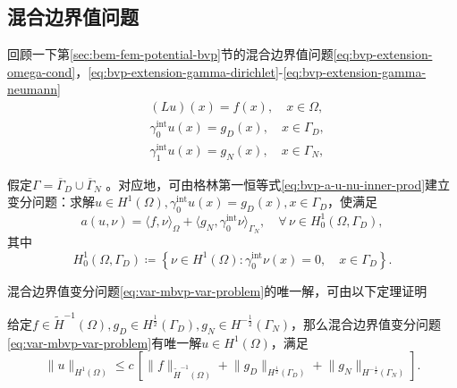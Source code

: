 \subsection{混合边界值问题}
\label{sec:var-mbvp-problem}

回顾一下第\ref{sec:bem-fem-potential-bvp}节的混合边界值问题\eqref{eq:bvp-extension-omega-cond}，\eqref{eq:bvp-extension-gamma-dirichlet}-\eqref{eq:bvp-extension-gamma-neumann}
\begin{equation}
  \label{eq:var-mbvp-problem}
  \begin{split}
    &(L u)(x) = f(x), \quad x \in \Omega, \\
    &\gamma_{0}^{\text{int}} u(x) = g_{D} (x), \quad x \in \Gamma_D,\\
    &\gamma_{1}^{\text{int}} u(x) = g_{N} (x), \quad x \in \Gamma_N,
  \end{split}
\end{equation}

假定$\Gamma = \overline{\Gamma}_{D} \cup \overline{\Gamma}_{N}$ 。对应地，可由格林第一恒等式\eqref{eq:bvp-a-u-nu-inner-prod}建立变分问题：求解$u \in H^{1}(\Omega), \gamma_{0}^{\text{int}} u(x) = g_{D}(x), x \in \Gamma_D$，使满足
\begin{equation}
  \label{eq:var-mbvp-var-problem}
  a(u,\nu) = \langle f, \nu \rangle_{\Omega} +
  \langle g_N, \gamma_{0}^{\text{int}} \nu \rangle_{\Gamma_N},
  \quad \forall \, \nu \in H_{0}^{1}(\Omega, \Gamma_D),
\end{equation}
其中
\begin{equation*}
  H_{0}^{1} (\Omega, \Gamma_D) \coloneqq
  \left\{
  \nu \in H^{1}(\Omega): \gamma_{0}^{\text{int}} \nu(x) =0, \quad x \in \Gamma_D
  \right\}.
\end{equation*}

混合边界值变分问题\eqref{eq:var-mbvp-var-problem}的唯一解，可由以下定理证明
\begin{theorem}[混合边界值变分问题的唯一解]
  \label{theorem:var-mbvp-var-problem-solution}
  给定$f \in \widetilde{H}^{-1}(\Omega), g_{D} \in H^{\frac{1}{2}}(\Gamma_{D}), g_{N} \in H^{-\frac{1}{2}}(\Gamma_{N})$，那么混合边界值变分问题\eqref{eq:var-mbvp-var-problem}有唯一解$u \in H^{1}(\Omega)$，满足
  \begin{equation}
    \label{eq:var-mbvp-var-problem-solution}
    \big\| u \big\|_{H^{1}(\Omega)} \le c \,
    \left[
    \big\| f \big\|_{\widetilde{H}^{-1}(\Omega)}
    + \big\| g_{D} \big\|_{H^{\frac{1}{2}}(\Gamma_{D})}
    + \big\| g_{N} \big\|_{H^{- \frac{1}{2}}(\Gamma_{N})}
    \right].
  \end{equation}
\end{theorem}

